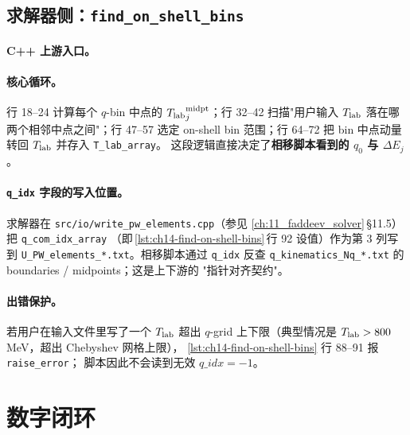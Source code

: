\subsection{求解器侧：\texttt{find\_on\_shell\_bins}}
\label{subsec:ch14-solver-side}

\paragraph{C++ 上游入口。}


\paragraph{核心循环。}
行 18--24 计算每个 \(q\)-bin 中点的 \({T_{\text{lab}}}^{\rm midpt}_j\)；行 32--42
扫描"用户输入 \({T_{\text{lab}}}\) 落在哪两个相邻中点之间"；行 47--57 选定 on-shell
bin 范围；行 64--72 把 bin 中点动量转回 \({T_{\text{lab}}}\) 并存入 \texttt{T\_lab\_array}。
这段逻辑直接决定了\textbf{相移脚本看到的 \(q_0\) 与 \(\Delta E_j\)}。

\paragraph{\texttt{q\_idx} 字段的写入位置。}
求解器在 \texttt{src/io/write\_pw\_elements.cpp}（参见
\cref{ch:11_faddeev_solver}\(\,\)\S 11.5）把 \texttt{q\_com\_idx\_array}
（即\(\,\)\cref{lst:ch14-find-on-shell-bins}\(\,\)行 92 设值）作为第 3 列写到
\texttt{U\_PW\_elements\_*.txt}。相移脚本通过 \texttt{q\_idx} 反查
\texttt{q\_kinematics\_Nq\_*.txt} 的 boundaries / midpoints；这是上下游的
"指针对齐契约"。

\paragraph{出错保护。}
若用户在输入文件里写了一个 \({T_{\text{lab}}}\) 超出 \(q\)-grid 上下限（典型情况是
\({T_{\text{lab}}} > 800\) MeV，超出 Chebyshev 网格上限），
\cref{lst:ch14-find-on-shell-bins} 行 88--91 报 \texttt{raise\_error}；
脚本因此不会读到无效 \(q\_idx = -1\)。

\section{数字闭环}
\label{sec:ch14-numerics}


